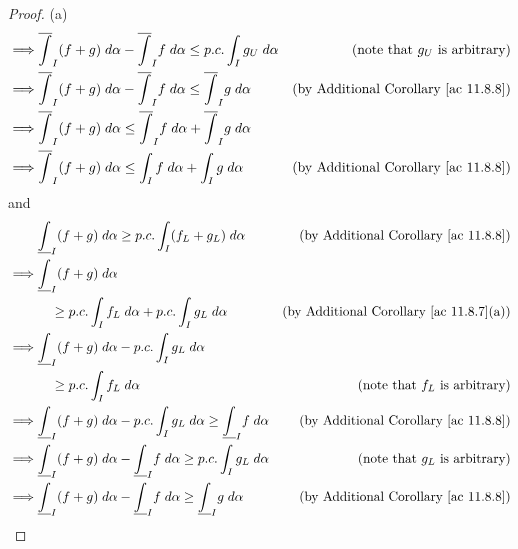 \begin{proof}{(a)}
\begin{align*}
        \implies & \overline{\int}_I (f + g) \; d \alpha - \overline{\int}_I f \; d \alpha \leq p.c. \int_I g_U \; d \alpha     & \text{(note that \(g_U\) is arbitrary)}             \\
        \implies & \overline{\int}_I (f + g) \; d \alpha - \overline{\int}_I f \; d \alpha \leq \overline{\int}_I g \; d \alpha & \text{(by Additional Corollary \ref{ac 11.8.8})}    \\
        \implies & \overline{\int}_I (f + g) \; d \alpha \leq \overline{\int}_I f \; d \alpha + \overline{\int}_I g \; d \alpha &                                                     \\
        \implies & \overline{\int}_I (f + g) \; d \alpha \leq \int_I f \; d \alpha + \int_I g \; d \alpha                       & \text{(by Additional Corollary \ref{ac 11.8.8})}
    \end{align*}
    and
    \begin{align*}
                 & \underline{\int}_I (f + g) \; d \alpha \geq p.c. \int_I (f_L + g_L) \; d \alpha                                 & \text{(by Additional Corollary \ref{ac 11.8.8})}    \\
        \implies & \underline{\int}_I (f + g) \; d \alpha                                                                                                                                \\
                 & \quad \geq p.c. \int_I f_L \; d \alpha + p.c. \int_I g_L \; d \alpha                                            & \text{(by Additional Corollary \ref{ac 11.8.7}(a))} \\
        \implies & \underline{\int}_I (f + g) \; d \alpha - p.c. \int_I g_L \; d \alpha                                                                                                  \\
                 & \quad \geq p.c. \int_I f_L \; d \alpha                                                                          & \text{(note that \(f_L\) is arbitrary)}             \\
        \implies & \underline{\int}_I (f + g) \; d \alpha - p.c. \int_I g_L \; d \alpha \geq \underline{\int}_I f \; d \alpha      & \text{(by Additional Corollary \ref{ac 11.8.8})}    \\
        \implies & \underline{\int}_I (f + g) \; d \alpha - \underline{\int}_I f \; d \alpha \geq p.c. \int_I g_L \; d \alpha      & \text{(note that \(g_L\) is arbitrary)}             \\
        \implies & \underline{\int}_I (f + g) \; d \alpha - \underline{\int}_I f \; d \alpha \geq \underline{\int}_I g \; d \alpha & \text{(by Additional Corollary \ref{ac 11.8.8})}    \\

\end{align*}
\end{proof}
